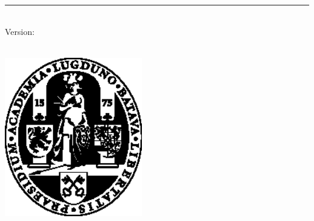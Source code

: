 %
\begin{titlepage}
	\flushright
	\hfill
	\vfill
	{\LARGE\thesisTitle \par}
	\rule[5pt]{\textwidth}{.4pt} \par
	{\Large\thesisName}
	\vfill
	\textit{\large\thesisDate} \\
	Version: \thesisVersion
\end{titlepage}


\begin{titlepage}
	\tgherosfont
	\centering

	{\Large \thesisUniversity} \\[4mm]
	\includegraphics[width=6cm]{figs/ullogo} \\[2mm]
	\textsf{\thesisUniversityDepartment} \\
	\textsf{\thesisUniversityInstitute} \\
	\textsf{\thesisUniversityGroup} \\

	\vfill
	{\large \thesisSubject} \\[5mm]
	{\LARGE \color{ctcolortitle}\textbf{\thesisTitle} \\[10mm]}
	{\Large \thesisName} \\


\end{titlepage}
